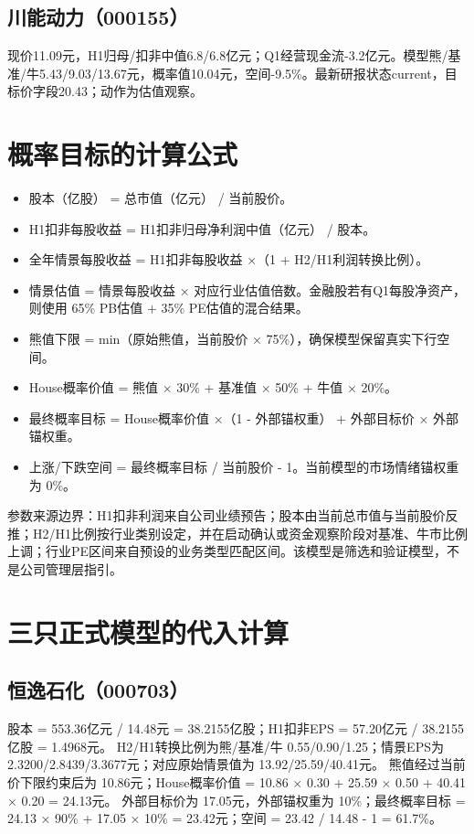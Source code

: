 \subsection{川能动力（000155）}
现价11.09元，H1归母/扣非中值6.8/6.8亿元；Q1经营现金流-3.2亿元。模型熊/基准/牛5.43/9.03/13.67元，概率值10.04元，空间-9.5\%。最新研报状态current，目标价字段20.43；动作为估值观察。

\section{概率目标的计算公式}

\begin{exhibitbox}[概率目标计算公式与参数顺序]
\small
\begin{itemize}
\item 股本（亿股） = 总市值（亿元） / 当前股价。
\item H1扣非每股收益 = H1扣非归母净利润中值（亿元） / 股本。
\item 全年情景每股收益 = H1扣非每股收益 ×（1 + H2/H1利润转换比例）。
\item 情景估值 = 情景每股收益 × 对应行业估值倍数。金融股若有Q1每股净资产，则使用 65\% PB估值 + 35\% PE估值的混合结果。
\item 熊值下限 = min（原始熊值，当前股价 × 75\%），确保模型保留真实下行空间。
\item House概率价值 = 熊值 × 30\% + 基准值 × 50\% + 牛值 × 20\%。
\item 最终概率目标 = House概率价值 ×（1 - 外部锚权重） + 外部目标价 × 外部锚权重。
\item 上涨/下跌空间 = 最终概率目标 / 当前股价 - 1。当前模型的市场情绪锚权重为 0\%。
\end{itemize}
\normalsize
\end{exhibitbox}

参数来源边界：H1扣非利润来自公司业绩预告；股本由当前总市值与当前股价反推；H2/H1比例按行业类别设定，并在启动确认或资金观察阶段对基准、牛市比例上调；行业PE区间来自预设的业务类型匹配区间。该模型是筛选和验证模型，不是公司管理层指引。

\section{三只正式模型的代入计算}

\subsection{恒逸石化（000703）}
股本 = 553.36亿元 / 14.48元 = 38.2155亿股；H1扣非EPS = 57.20亿元 / 38.2155亿股 = 1.4968元。
H2/H1转换比例为熊/基准/牛 0.55/0.90/1.25；情景EPS为 2.3200/2.8439/3.3677元；对应原始情景值为 13.92/25.59/40.41元。
熊值经过当前价下限约束后为 10.86元；House概率价值 = 10.86 × 0.30 + 25.59 × 0.50 + 40.41 × 0.20 = 24.13元。
外部目标价为 17.05元，外部锚权重为 10\%；最终概率目标 = 24.13 × 90\% + 17.05 × 10\% = 23.42元；空间 = 23.42 / 14.48 - 1 = 61.7\%。


